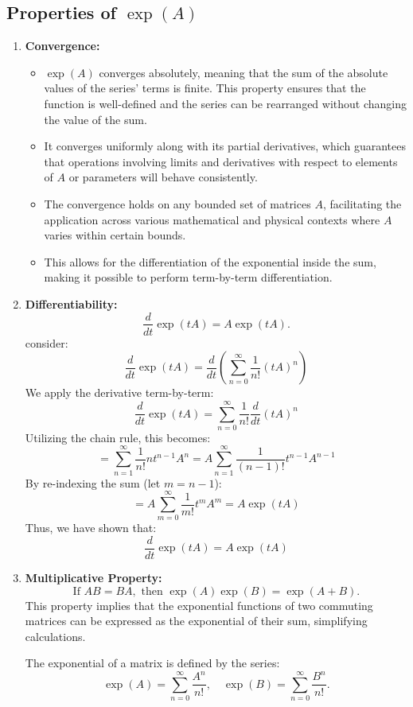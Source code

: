 \documentclass{article}
\begin{document}
\subsection*{Properties of \(\exp(A)\)}
\begin{enumerate}
    \item \textbf{Convergence:}
    \begin{itemize}
        \item \(\exp(A)\) converges absolutely, meaning that the sum of the absolute values of the series' terms is finite. This property ensures that the function is well-defined and the series can be rearranged without changing the value of the sum.
        \item It converges uniformly along with its partial derivatives, which guarantees that operations involving limits and derivatives with respect to elements of \(A\) or parameters will behave consistently.
        \item The convergence holds on any bounded set of matrices \(A\), facilitating the application across various mathematical and physical contexts where \(A\) varies within certain bounds.
        \item This allows for the differentiation of the exponential inside the sum, making it possible to perform term-by-term differentiation. 
    \end{itemize}

    \item \textbf{Differentiability:}
    \[
    \frac{d}{dt} \exp(tA) = A \exp(tA).
    \]
  consider:
\[
\frac{d}{dt} \exp(tA) = \frac{d}{dt} \left( \sum_{n=0}^{\infty} \frac{1}{n!} (tA)^n \right)
\]
We apply the derivative term-by-term:
\[
\frac{d}{dt} \exp(tA) = \sum_{n=0}^{\infty} \frac{1}{n!} \frac{d}{dt} (tA)^n
\]
Utilizing the chain rule, this becomes:
\[
= \sum_{n=1}^{\infty} \frac{1}{n!} n t^{n-1} A^n = A \sum_{n=1}^{\infty} \frac{1}{(n-1)!} t^{n-1} A^{n-1}
\]
By re-indexing the sum (let \( m = n-1 \)):
\[
= A \sum_{m=0}^{\infty} \frac{1}{m!} t^m A^m = A \exp(tA)
\]
Thus, we have shown that:
\[
\frac{d}{dt} \exp(tA) = A \exp(tA)
\] 
    \item \textbf{Multiplicative Property:}
    \[
    \text{If } AB = BA, \text{ then } \exp(A) \exp(B) = \exp(A + B).
    \]
    This property implies that the exponential functions of two commuting matrices can be expressed as the exponential of their sum, simplifying calculations. 

    The exponential of a matrix is defined by the series:
\[
\exp(A) = \sum_{n=0}^\infty \frac{A^n}{n!}, \quad \exp(B) = \sum_{n=0}^\infty \frac{B^n}{n!}.
\]


\end{enumerate}
\end{document}
